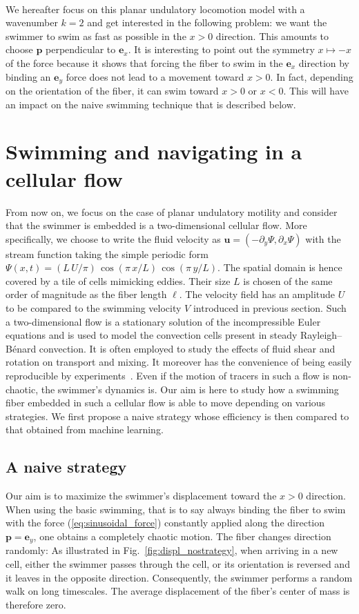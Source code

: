 \documentclass[aps,prl,preprint,groupedaddress]{revtex4-2}
\begin{document}
\

We hereafter focus on this planar undulatory locomotion model with a wavenumber $k=2$ and get interested in the following problem: we want the swimmer to swim as fast as possible in the $x>0$ direction. This amounts to choose $\bm p$ perpendicular to $\bm e_x$. It is interesting to point out the symmetry  $x\mapsto-x$ of the force because it shows that forcing the fiber to swim in the $\bm e_x$ direction by binding an $\bm e_y$ force does not lead to a movement toward $x>0$. In fact, depending on the orientation of the fiber, it can swim toward $x>0$ or $x<0$. This will have an impact on the naive swimming technique that is described below. 

\section{Swimming and navigating in a cellular flow}
From now on, we focus on the case of planar undulatory motility and consider that the swimmer is embedded is a two-dimensional cellular flow. More specifically, we choose to write the fluid velocity as $\bm u = (-\partial_y\Psi,\partial_x\Psi)$ with the stream function taking the simple periodic form $\Psi(x,t) = (L\,U/\pi)\,\cos(\pi\,x/L)\,\cos(\pi\,y/L)$. The spatial domain is hence covered by a tile of cells mimicking eddies. Their size $L$ is chosen of the same order of magnitude as the fiber length $\ell$. The velocity field has an amplitude $U$ to be compared to the swimming velocity $V$ introduced in previous section. Such a two-dimensional flow is a stationary solution of the incompressible Euler equations and is used to model the convection cells present in steady Rayleigh--B\'enard convection. It is often employed to study the effects of fluid shear and rotation on transport and mixing. It moreover has the convenience of being easily reproducible by experiments~\cite{rothstein1999persistent}. Even if the motion of tracers in such a flow is non-chaotic, the swimmer's dynamics is. Our aim is here to study how a swimming fiber embedded in such a cellular flow is able to move depending on various strategies. We first propose a naive strategy whose efficiency is then compared to that obtained from machine learning.

\subsection{A naive strategy}

Our aim is to maximize the swimmer's displacement toward the $x>0$ direction. When using the basic swimming, that is to say always binding the fiber to swim with the force (\ref{eq:sinusoidal_force}) constantly applied along the direction $\bm p = \bm e_y$, one obtains a completely chaotic motion. The fiber changes direction randomly: As illustrated in Fig.~\ref{fig:displ_nostrategy}, when arriving in a new cell, either the swimmer passes through the cell, or its orientation is reversed and it leaves in the opposite direction. Consequently, the swimmer performs a random walk on long timescales. The average displacement of the fiber's center of mass is therefore zero.
\end{document}
